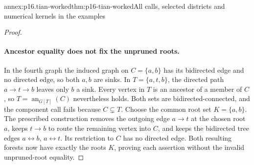 \begin{annexitem}{annex:p16.tian-worked}{thm:p16-tian-worked}{All calls, selected districts and numerical kernels in the examples}
\begin{proof}
\paragraph{Ancestor equality does not fix the unpruned roots.}
In the fourth graph the induced graph on \(C=\{a,b\}\)
has its bidirected edge and no directed edge, so both \(a,b\)
are sinks. In \(T=\{a,t,b\}\), the directed path
\(a\to t\to b\) leaves only \(b\) a sink. Every vertex
in \(T\) is an ancestor of a member of \(C\), so
\(T=\operatorname{an}_{G[T]}(C)\) nevertheless holds.
Both sets are bidirected-connected, and the component call fails
because \(C\subsetneq T\). Choose the common root set
\(K=\{a,b\}\). The prescribed construction removes the
outgoing edge \(a\to t\) at the chosen root \(a\), keeps
\(t\to b\) to route the remaining vertex into \(C\),
and keeps the bidirected tree edges \(a\leftrightarrow b\),
\(a\leftrightarrow t\). Its restriction to \(C\) has
no directed edge. Both resulting forests now have exactly the
roots \(K\), proving each assertion without the invalid
unpruned-root equality.
\end{proof}
\end{annexitem}
